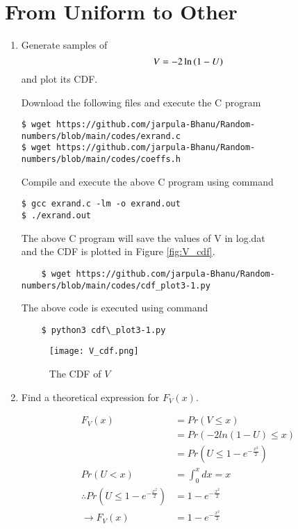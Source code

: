 \documentclass[journal,12pt,twocolumn]{IEEEtran}
\renewcommand\thesection{\arabic{section}}
\begin{document}
\section{From Uniform to Other}
\begin{enumerate}[label=\thesection.\arabic*
,ref=\thesection.\theenumi]
%
\item
Generate samples of 
%
\begin{equation}
V = -2\ln\left(1-U\right)
\end{equation}
%
and plot its CDF. 

\solution
Download the following files and execute the C program
\begin{lstlisting}
$ wget https://github.com/jarpula-Bhanu/Random-numbers/blob/main/codes/exrand.c
$ wget https://github.com/jarpula-Bhanu/Random-numbers/blob/main/codes/coeffs.h
\end{lstlisting}
Compile and execute the above C program using command
\begin{lstlisting}
$ gcc exrand.c -lm -o exrand.out
$ ./exrand.out
\end{lstlisting}
The above C program will save the values of V in log.dat\\

and the CDF is plotted in Figure \eqref{fig:V_cdf}.

\begin{lstlisting}
    $ wget https://github.com/jarpula-Bhanu/Random-numbers/blob/main/codes/cdf_plot3-1.py
\end{lstlisting}
The above code is executed using command
\begin{lstlisting}
    $ python3 cdf\_plot3-1.py
\end{lstlisting}


\begin{figure}[h]
    \centering
    \texttt{[image: V\_cdf.png]}
    \caption{The CDF of $V$}
    \label{fig:V_cdf}
\end{figure}

\item Find a theoretical expression for $F_V(x)$.

\begin{align}
    F_V(x) &= Pr(V \le x)\\
    &= Pr(-2 ln(1-U) \le x) \\
    &= Pr(U \le 1-e^{-\frac{x^2}{2}}) \\
    Pr(U<x) &= \int_0^x dx = x \\
    \therefore Pr(U \le 1-e^{-\frac{x^2}{2}}) &= 1-e^{-\frac{x^2}{2}} \\
    \rightarrow F_V(x) &=1-e^{-\frac{x^2}{2}}
\end{align}
%

\end{enumerate}
\end{document}
